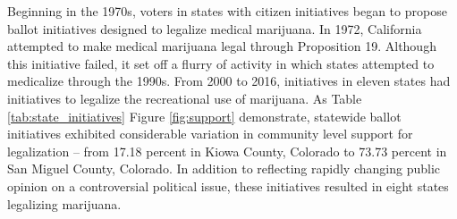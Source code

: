 Beginning in the 1970s, voters in states with citizen initiatives began to propose ballot initiatives designed to legalize medical marijuana. In 1972, California attempted to make medical marijuana legal through Proposition 19. Although this initiative failed, it set off a flurry of activity in which states attempted to medicalize through the 1990s. From 2000 to 2016, initiatives in eleven states had initiatives to legalize the recreational use of marijuana. As Table \ref{tab:state_initiatives} Figure \ref{fig:support} demonstrate, statewide ballot initiatives exhibited considerable variation in community level support for legalization -- from 17.18 percent in Kiowa County, Colorado to 73.73 percent in San Miguel County, Colorado. In addition to reflecting rapidly changing public opinion on a controversial political issue, these initiatives resulted in eight states legalizing marijuana. 










